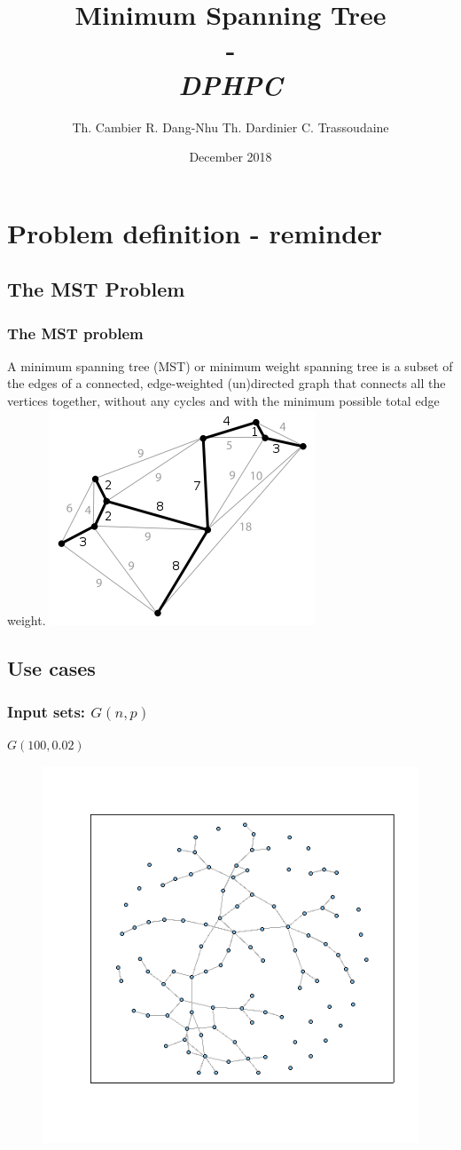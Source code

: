 \documentclass{beamer}
\institute[ETH Zürich]{\textbf{ETH Zürich}}
\date{December 2018}
\author{
    Th. Cambier
    R. Dang-Nhu
    Th. Dardinier
    C. Trassoudaine
}
\title{
	\textbf{Minimum Spanning Tree}\\
	-\\ 
	\textit{DPHPC}
}
\begin{document}

\frame{\titlepage}
\frame{\tableofcontents}



\section{Problem definition - reminder}
\subsection{The MST Problem}
\begin{frame}
\frametitle{The MST problem}
 A minimum spanning tree (MST) or minimum weight spanning tree is a subset of the edges of a connected, edge-weighted (un)directed graph that connects all the vertices together, without any cycles and with the minimum possible total edge weight. 
 \includegraphics[width=.5\textwidth]{MST.png}
\end{frame}


\subsection{Use cases}

\begin{frame}
\frametitle{Input sets: $G(n,p)$}
\centering
$G(100, 0.02)$
\begin{figure}
 \includegraphics[width=.7\textwidth]{graphGNP.png}
\end{figure}
\end{frame}
\end{document}
